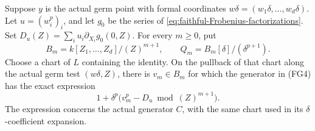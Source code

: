 \begin{srlemma}\label{lem:faithful-pfold-jet-value}
Suppose \(y\) is the actual germ point with formal
coordinates \(w\delta=(w_1\delta,\ldots,w_d\delta)\).
Let \(u=(w_i^p)_i\), and let \(g_0\) be the series of
\eqref{eq:faithful-Frobenius-factorizations}.
Set \(D_u(Z)=\sum_i u_i\partial_{X_i}g_0(0,Z)\).
For every \(m\ge0\), put
\[
 B_m=k[Z_1,\ldots,Z_d]/(Z)^{m+1},\qquad
 Q_m=B_m[\delta]/(\delta^{p+1}).
\]
Choose a chart of \(L\) containing the identity.
On the pullback of that chart along the actual germ
test \((w\delta,Z)\), there is \(v_m\in B_m\) for which
the generator in (FG4) has the exact expression
\[
                  1+\delta^p\bigl(v_m^p-D_u\bmod(Z)^{m+1}\bigr).
 \tag{FG5}\label{eq:faithful-pfold-jet-value}
\]
The expression concerns the actual generator \(C\), with
the same chart used in its \(\delta\)-coefficient expansion.
\end{srlemma}
